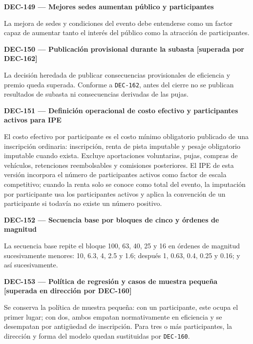 \documentclass[10pt,letterpaper]{article}
\begin{document}
\noindent\textbf{DEC-149 --- Mejores sedes aumentan público y participantes}\par
La mejora de sedes y condiciones del evento debe entenderse como un factor capaz de aumentar tanto el interés del público como la atracción de participantes.\par\vspace{0.45em}
\noindent\textbf{DEC-150 --- Publicación provisional durante la subasta [superada por DEC-162]}\par
La decisión heredada de publicar consecuencias provisionales de eficiencia y premio queda superada. Conforme a \texttt{DEC-162}, antes del cierre no se publican resultados de subasta ni consecuencias derivadas de las pujas.\par\vspace{0.45em}
\noindent\textbf{DEC-151 --- Definición operacional de costo efectivo y participantes activos para IPE}\par
El costo efectivo por participante es el costo mínimo obligatorio publicado de una inscripción ordinaria: inscripción, renta de pista imputable y pesaje obligatorio imputable cuando exista. Excluye aportaciones voluntarias, pujas, compras de vehículos, retenciones reembolsables y comisiones posteriores. El IPE de esta versión incorpora el número de participantes activos como factor de escala competitivo; cuando la renta solo se conoce como total del evento, la imputación por participante usa los participantes activos y aplica la convención de un participante si todavía no existe un número positivo.\par\vspace{0.45em}
\noindent\textbf{DEC-152 --- Secuencia base por bloques de cinco y órdenes de magnitud}\par
La secuencia base repite el bloque 100, 63, 40, 25 y 16 en órdenes de magnitud sucesivamente menores: 10, 6.3, 4, 2.5 y 1.6; después 1, 0.63, 0.4, 0.25 y 0.16; y así sucesivamente.\par\vspace{0.45em}
\noindent\textbf{DEC-153 --- Política de regresión y casos de muestra pequeña [superada en dirección por DEC-160]}\par
Se conserva la política de muestra pequeña: con un participante, este ocupa el primer lugar; con dos, ambos empatan normativamente en eficiencia y se desempatan por antigüedad de inscripción. Para tres o más participantes, la dirección y forma del modelo quedan sustituidas por \texttt{DEC-160}.\par\vspace{0.45em}
\end{document}
